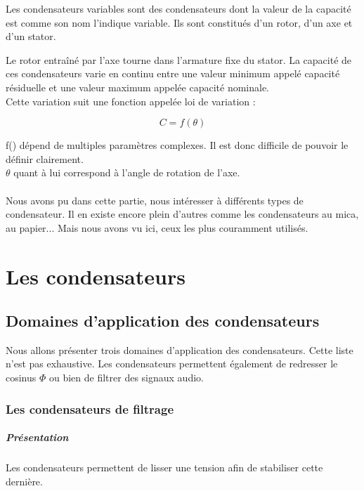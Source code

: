 Les condensateurs variables sont des condensateurs dont la valeur de la capacité est comme son nom l’indique variable. Ils sont constitués d’un rotor, d’un axe et d’un stator. 




Le rotor entraîné par l’axe tourne dans l’armature fixe du stator. La capacité de ces condensateurs varie en continu entre une valeur minimum appelé capacité résiduelle et une valeur maximum appelée capacité nominale. \\

Cette variation suit une fonction appelée loi de variation : 

$$ C=f(\theta) $$


f() dépend de multiples paramètres complexes. Il est donc difficile de pouvoir le définir clairement.\\
$\theta$ quant à lui correspond à l'angle de rotation de l'axe. \\ \\

Nous avons pu dans cette partie, nous intéresser à différents types de condensateur. Il en existe encore plein d'autres comme les condensateurs au mica, au papier... Mais nous avons vu ici, ceux les plus couramment utilisés.\part{Les condensateurs}
\chapter{Domaines d'application des condensateurs}

Nous allons présenter trois domaines d'application des condensateurs. Cette liste n'est pas exhaustive. Les condensateurs permettent également de redresser le cosinus $\Phi$ ou bien de filtrer des signaux audio.

\section{Les condensateurs de filtrage}

\subsubsection{Présentation}

Les condensateurs permettent de lisser une tension afin de stabiliser cette dernière.

